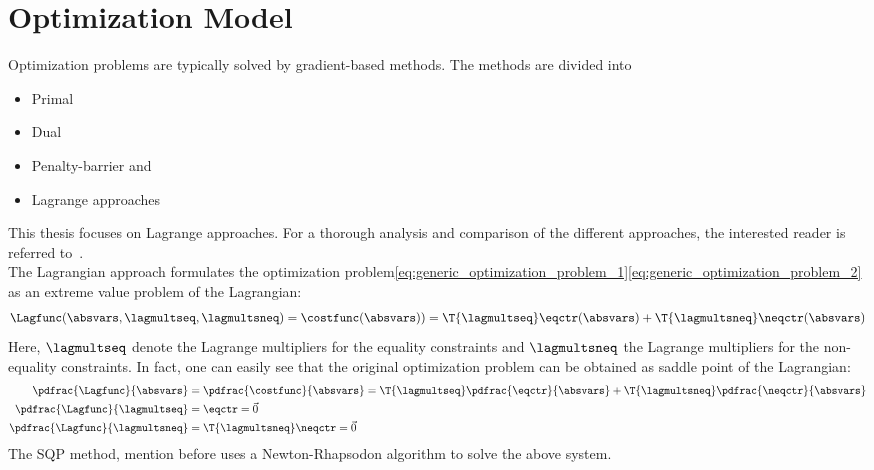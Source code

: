 \documentclass[../main.tex]{subfiles}
\begin{document}
\section{Optimization Model}\label{sec:optimization_model}
Optimization problems are typically solved by gradient-based methods. The methods are divided into
\begin{itemize}
\item Primal
\item Dual
\item Penalty-barrier   and
\item Lagrange approaches
\end{itemize}
This thesis focuses on Lagrange approaches. For a thorough analysis and comparison of the different approaches, the interested reader is referred to~\cite{Schittkowski1994}.\\
The Lagrangian approach formulates the optimization problem\eqref{eq:generic_optimization_problem_1}\eqref{eq:generic_optimization_problem_2} as an extreme value problem of the Lagrangian:
\begin{align}\label{eq:lagrangian_of_optimization}
\Lagfunc(\absvars,\lagmultseq,\lagmultsneq)=\costfunc(\absvars))=\T{\lagmultseq} \eqctr(\absvars) + \T{\lagmultsneq}\neqctr(\absvars) \\
\end{align}
Here, $\lagmultseq$ denote the Lagrange multipliers for the equality constraints and $\lagmultsneq$ the Lagrange multipliers for the non-equality constraints.
In fact, one can easily see that the original optimization problem can be obtained as saddle point of the Lagrangian:
\begin{align}\label{eq:saddlepoint_optimization}
\pdfrac{\Lagfunc}{\absvars}&=\pdfrac{\costfunc}{\absvars}=\T{\lagmultseq}\pdfrac{\eqctr}{\absvars}+\T{\lagmultsneq}\pdfrac{\neqctr}{\absvars} \\
\pdfrac{\Lagfunc}{\lagmultseq}&=\eqctr=\vec{0} \\
\pdfrac{\Lagfunc}{\lagmultsneq}&=\T{\lagmultsneq}\neqctr=\vec{0}
\end{align}
The \ac{SQP} method, mention before uses a Newton-Rhapsodon algorithm to solve the above system.



\def\incrabsvars{\Delta \absvars}
\def\incrlagmultsneq{\Delta \lagmultsneq}
\def\incrlagmultseq{\Delta \lagmultseq}

\def\PPLagfuncBYabsvars{\ppdfrac{\Lagfunc}{\absvars}}
\def\PLagfuncBYabsvars{\pdfrac{\Lagfunc}{\absvars}}
\def\PneqctrBYabsvars{\pdfrac{\neqctr}{\absvar}}
\def\PeqctrBYabsvars{\pdfrac{\eqctr}{\absvar}}
\end{document}
